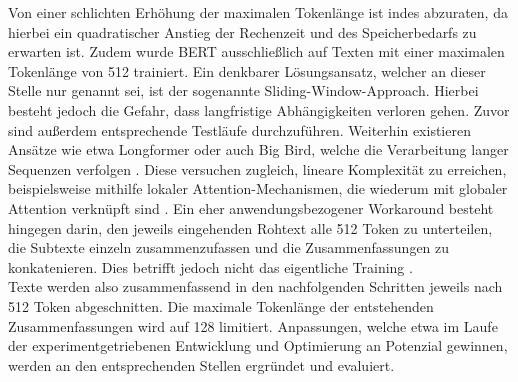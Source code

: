 \noindent
Von einer schlichten Erhöhung der maximalen Tokenlänge ist indes abzuraten, da hierbei ein quadratischer Anstieg der Rechenzeit und des Speicherbedarfs zu erwarten ist. Zudem wurde \ac{BERT} ausschließlich auf Texten mit einer maximalen Tokenlänge von 512 trainiert. Ein denkbarer Lösungsansatz, welcher an dieser Stelle nur genannt sei, ist der sogenannte Sliding-Window-Approach. Hierbei besteht jedoch die Gefahr, dass langfristige Abhängigkeiten verloren gehen. Zuvor sind außerdem entsprechende Testläufe durchzuführen. Weiterhin existieren Ansätze wie etwa Longformer oder auch Big Bird, welche die Verarbeitung langer Sequenzen verfolgen \cite{ZAH21}. Diese versuchen zugleich, lineare Komplexität zu erreichen, beispielsweise mithilfe lokaler Attention-Mechanismen, die wiederum mit globaler Attention verknüpft sind \cite{BEL20}. Ein eher anwendungsbezogener Workaround besteht hingegen darin, den jeweils eingehenden Rohtext alle 512 Token zu unterteilen, die Subtexte einzeln zusammenzufassen und die Zusammenfassungen zu konkatenieren. Dies betrifft jedoch nicht das eigentliche Training \cite[S.~2]{DIN20}.\\

\noindent
Texte werden also zusammenfassend in den nachfolgenden Schritten jeweils nach 512 Token abgeschnitten. Die maximale Tokenlänge der entstehenden Zusammenfassungen wird auf 128 limitiert. Anpassungen, welche etwa im Laufe der experimentgetriebenen Entwicklung und Optimierung an Potenzial gewinnen, werden an den entsprechenden Stellen ergründet und evaluiert.
